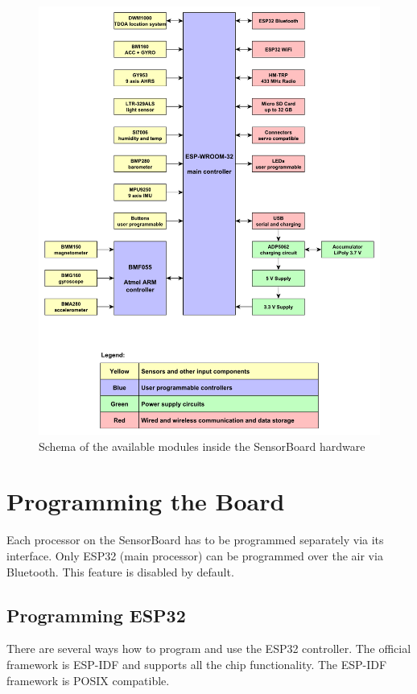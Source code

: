 \begin{figure}
	\centering
	\label{fig:SWmodules}
	\caption{Schema of the available modules inside the SensorBoard hardware}
	\includegraphics[width=\linewidth]{img/SensorBoardSchema.pdf}
\end{figure}

\section{Programming the Board}
Each processor on the SensorBoard has to be programmed separately via its interface. Only ESP32 \cite{espressif:ESP-WROOM-32} (main processor) can be programmed over the air via Bluetooth. This feature is disabled by default.

\subsection{Programming ESP32}
There are several ways how to program and use the ESP32 \cite{espressif:ESP-WROOM-32} controller. The official framework is \ac{ESP-IDF} \cite{espressif:ESP-IDF} and supports all the chip functionality. The \ac{ESP-IDF} framework is \ac{POSIX} compatible.

